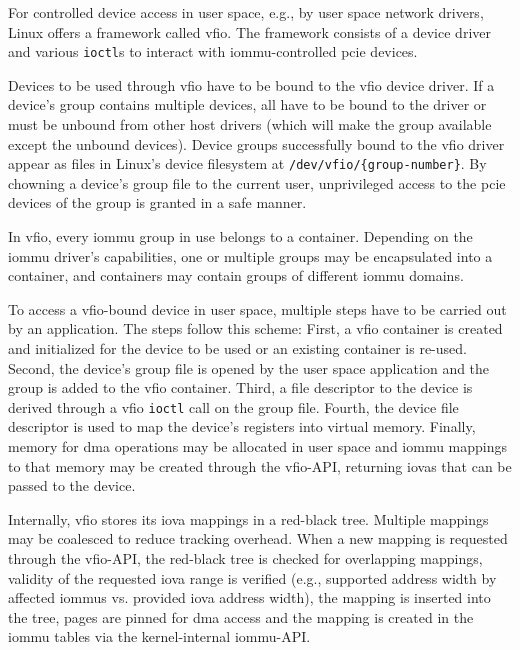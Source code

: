 For controlled device access in user space, e.g., by user space network drivers,
Linux offers a framework called \ac{vfio}. The framework consists of a device
driver and various \texttt{ioctl}s to interact with \ac{iommu}-controlled
\ac{pcie} devices.

Devices to be used through \ac{vfio} have to be bound to the \ac{vfio} device
driver. If a device's group contains multiple devices, all have to be bound to
the driver or must be unbound from other host drivers (which will make the group
available except the unbound devices). Device groups successfully bound to the
\ac{vfio} driver appear as files in Linux's device filesystem at
\texttt{/dev/vfio/\{group-number\}}. By chowning a device's group file to the
current user, unprivileged access to the \ac{pcie} devices of the group is
granted in a safe manner.

In \ac{vfio}, every \ac{iommu} group in use belongs to a container. Depending on
the \ac{iommu} driver's capabilities, one or multiple groups may be encapsulated
into a container, and containers may contain groups of different \ac{iommu}
domains.

To access a \ac{vfio}-bound device in user space, multiple steps have to be
carried out by an application. The steps follow this scheme: First, a \ac{vfio}
container is created and initialized for the device to be used or an existing
container is re-used. Second, the device's group file is opened by the
user space application and the group is added to the \ac{vfio} container. Third,
a file descriptor to the device is derived through a \ac{vfio} \texttt{ioctl}
call on the group file. Fourth, the device file descriptor is used to map the
device's registers into virtual memory. Finally, memory for \ac{dma} operations
may be allocated in user space and \ac{iommu} mappings to that memory may be
created through the \ac{vfio}-API, returning \acp{iova} that can be passed to
the device.

Internally, \ac{vfio} stores its \ac{iova} mappings in a red-black tree.
Multiple mappings may be coalesced to reduce tracking overhead. When a new
mapping is requested through the \ac{vfio}-API, the red-black tree is checked
for overlapping mappings, validity of the requested \ac{iova} range is verified
(e.g., supported address width by affected \acp{iommu} vs. provided \ac{iova}
address width), the mapping is inserted into the tree, pages are pinned for
\ac{dma} access and the mapping is created in the \ac{iommu} tables via the
kernel-internal \ac{iommu}-API.


